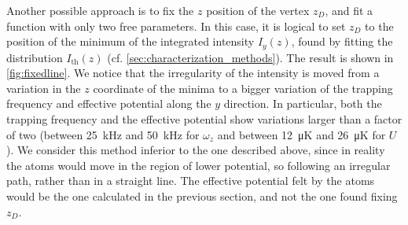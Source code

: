 Another possible approach is to fix the $z$ position of the vertex $z_D$, and fit a function with only two free parameters. In this case, it is logical to set $z_D$ to the position of the minimum of the integrated intensity $I_y(z)$, found by fitting the distribution $I_\text{th}(z)$ (cf. \cref{sec:characterization_methods}). The result is shown in \cref{fig:fixedline}. We notice that the irregularity of the intensity is moved from a variation in the $z$ coordinate of the minima to a bigger variation of the trapping frequency and effective potential along the $y$ direction. In particular, both the trapping frequency and the effective potential show variations larger than a factor of two (between \SI{25}{kHz} and \SI{50}{kHz} for $\omega_z$ and between \SI{12}{\micro K} and \SI{26}{\micro K} for $U$). We consider this method inferior to the one described above, since in reality the atoms would move in the region of lower potential, so following an irregular path, rather than in a straight line. The effective potential felt by the atoms would be the one calculated in the previous section, and not the one found fixing $z_D$.

